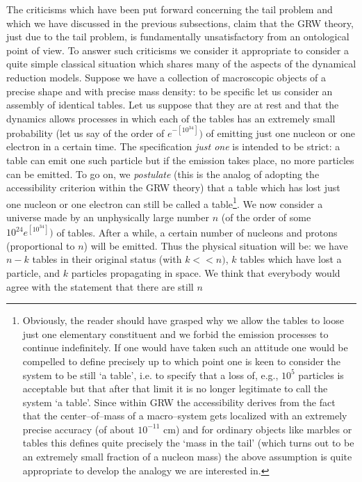\documentclass[12pt]{article}
\begin{document}
The criticisms which have been put forward concerning the tail
problem and which we have discussed in the previous subsections,
claim that the GRW theory, just due to the tail problem, is
fundamentally unsatisfactory from an ontological point of view. To
answer such criticisms we consider it appropriate to consider a
quite simple classical situation which shares many of the aspects
of the dynamical reduction models. Suppose we have a collection of
macroscopic objects of a precise shape and with precise mass
density: to be specific let us consider an assembly of identical
tables. Let us suppose that they are at rest and that the dynamics
allows processes in which each of the tables has an extremely
small probability (let us say of the order of $e^{-[10^{34}]})$ of
emitting just one nucleon or one electron in a certain time. The
specification {\it just one} is intended to be strict: a table can
emit one such particle but if the emission takes place, no more
particles  can be emitted. To go on, we {\it postulate} (this is
the analog of adopting the accessibility criterion within the GRW
theory) that a table which has lost just one nucleon or one
electron can still be called a table\footnote{Obviously, the
reader should have grasped why we allow the tables to loose just
one elementary constituent and we forbid the emission processes to
continue indefinitely. If one would have taken such an attitude
one would be compelled to define precisely up to which point one
is keen to consider the system to be still `a table', i.e. to
specify that a loss of, e.g., $10^{5}$ particles is acceptable but
that after that limit it is no longer legitimate  to call the
system `a table'. Since within GRW the accessibility derives from
the fact that the center--of--mass of a macro--system gets
localized with an extremely precise  accuracy (of about
$10^{-11}$ cm) and for ordinary objects like marbles or tables
this defines quite precisely the `mass in the tail' (which turns
out to be an extremely small fraction of a nucleon mass) the above
assumption is quite appropriate to develop the analogy we are
interested in.}. We now consider a universe made by an
unphysically large number $n$ (of the order of some
$10^{24}e^{[10^{34}]})$ of tables. After a while, a certain number
of nucleons and protons (proportional to $n$) will be emitted.
Thus the physical situation will be: we have $n-k$ tables in their
original status (with $k<<n)$, $k$ tables which have lost a
particle, and $k$ particles propagating in space. We think that
everybody would agree with the statement that there are still $n$
\end{document}
